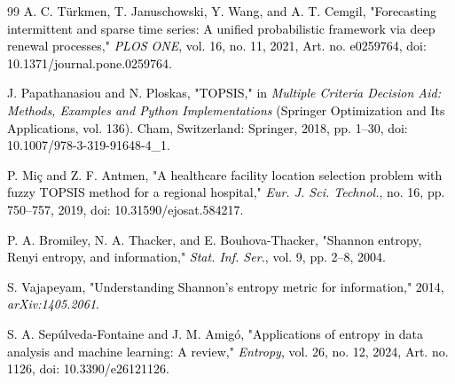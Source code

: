 \documentclass[final, 9pt, twocolumn]{saucis}
\newcommand{\rev}[1]{\textcolor{black}{#1}}
\begin{document}
\begin{thebibliography}{99}
 \rev{A. C. Türkmen, T. Januschowski, Y. Wang, and A. T. Cemgil, "Forecasting intermittent and sparse time series: A unified probabilistic framework via deep renewal processes," \emph{PLOS ONE}, vol. 16, no. 11, 2021, Art. no. e0259764, doi: 10.1371/journal.pone.0259764.}

 \rev{J. Papathanasiou and N. Ploskas, "TOPSIS," in \emph{Multiple Criteria Decision Aid: Methods, Examples and Python Implementations} (Springer Optimization and Its Applications, vol. 136). Cham, Switzerland: Springer, 2018, pp. 1--30, doi: 10.1007/978-3-319-91648-4\_1.}

 \rev{P. Miç and Z. F. Antmen, "A healthcare facility location selection problem with fuzzy TOPSIS method for a regional hospital," \emph{Eur. J. Sci. Technol.}, no. 16, pp. 750--757, 2019, doi: 10.31590/ejosat.584217.}

 \rev{P. A. Bromiley, N. A. Thacker, and E. Bouhova-Thacker, "Shannon entropy, Renyi entropy, and information," \emph{Stat. Inf. Ser.}, vol. 9, pp. 2--8, 2004.}

 \rev{S. Vajapeyam, "Understanding Shannon's entropy metric for information," 2014, \emph{arXiv:1405.2061}.}

 \rev{S. A. Sepúlveda-Fontaine and J. M. Amigó, "Applications of entropy in data analysis and machine learning: A review," \emph{Entropy}, vol. 26, no. 12, 2024, Art. no. 1126, doi: 10.3390/e26121126.}

\end{thebibliography}
\end{document}

